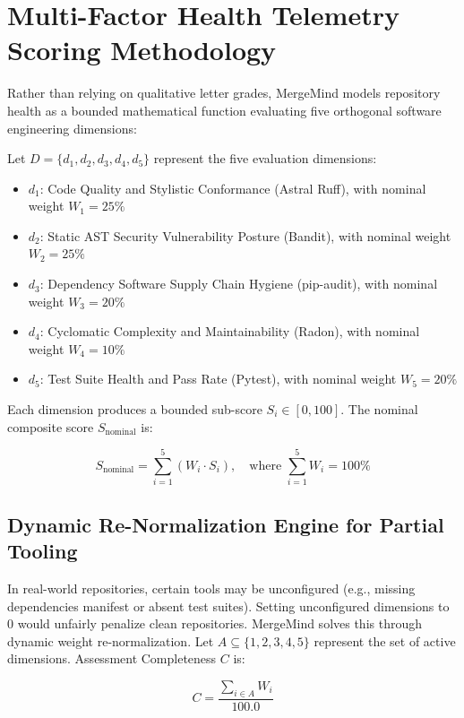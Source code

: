 \section{Multi-Factor Health Telemetry Scoring Methodology}
\label{sec:health-methodology}

Rather than relying on qualitative letter grades, MergeMind models repository health as a bounded mathematical function evaluating five orthogonal software engineering dimensions:

Let $D = \{d_1, d_2, d_3, d_4, d_5\}$ represent the five evaluation dimensions:
\begin{itemize}
    \item $d_1$: Code Quality and Stylistic Conformance (Astral Ruff), with nominal weight $W_1 = 25\%$
    \item $d_2$: Static AST Security Vulnerability Posture (Bandit), with nominal weight $W_2 = 25\%$
    \item $d_3$: Dependency Software Supply Chain Hygiene (pip-audit), with nominal weight $W_3 = 20\%$
    \item $d_4$: Cyclomatic Complexity and Maintainability (Radon), with nominal weight $W_4 = 10\%$
    \item $d_5$: Test Suite Health and Pass Rate (Pytest), with nominal weight $W_5 = 20\%$
\end{itemize}

Each dimension produces a bounded sub-score $S_i \in [0, 100]$. The nominal composite score $S_{\text{nominal}}$ is:

\begin{equation}
S_{\text{nominal}} = \sum_{i=1}^{5} (W_i \cdot S_i), \quad \text{where } \sum_{i=1}^{5} W_i = 100\%
\label{eq:nominal-health-score}
\end{equation}

\subsection{Dynamic Re-Normalization Engine for Partial Tooling}
In real-world repositories, certain tools may be unconfigured (e.g., missing dependencies manifest or absent test suites). Setting unconfigured dimensions to 0 would unfairly penalize clean repositories. MergeMind solves this through dynamic weight re-normalization. Let $A \subseteq \{1, 2, 3, 4, 5\}$ represent the set of active dimensions. Assessment Completeness $C$ is:

\begin{equation}
C = \frac{\sum_{i \in A} W_i}{100.0}
\label{eq:completeness}
\end{equation}

